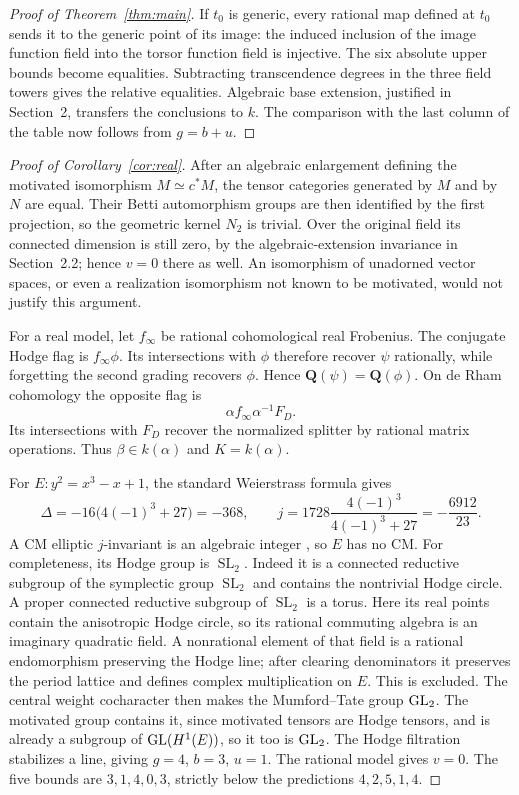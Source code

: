\documentclass[11pt]{article}
\theoremstyle{definition}\newtheorem{definition}[theorem]{Definition}
\theoremstyle{remark}\newtheorem{remark}[theorem]{Remark}
\newcommand{\Q}{\mathbf Q}\newcommand{\Z}{\mathbf Z}
\DeclareMathOperator{\SL}{SL}\DeclareMathOperator{\End}{End}
\begin{document}
\begin{proof}[Proof of Theorem~\ref{thm:main}]
If $t_0$ is generic, every rational map defined at $t_0$ sends it to the generic point of its image: the induced inclusion of the image function field into the torsor function field is injective. The six absolute upper bounds become equalities. Subtracting transcendence degrees in the three field towers gives the relative equalities. Algebraic base extension, justified in Section~2, transfers the conclusions to $k$. The comparison with the last column of the table now follows from $g=b+u$.
\end{proof}

\begin{proof}[Proof of Corollary~\ref{cor:real}]
After an algebraic enlargement defining the motivated isomorphism $M\simeq c^*M$, the tensor categories generated by $M$ and by $N$ are equal. Their Betti automorphism groups are then identified by the first projection, so the geometric kernel $N_2$ is trivial. Over the original field its connected dimension is still zero, by the algebraic-extension invariance in Section~2.2; hence $v=0$ there as well. An isomorphism of unadorned vector spaces, or even a realization isomorphism not known to be motivated, would not justify this argument.

For a real model, let $f_\infty$ be rational cohomological real Frobenius. The conjugate Hodge flag is $f_\infty\phi$. Its intersections with $\phi$ therefore recover $\psi$ rationally, while forgetting the second grading recovers $\phi$. Hence $\Q(\psi)=\Q(\phi)$. On de Rham cohomology the opposite flag is
\[
                    \alpha f_\infty\alpha^{-1}F_D.
\]
Its intersections with $F_D$ recover the normalized splitter by rational matrix operations. Thus $\beta\in k(\alpha)$ and $K=k(\alpha)$.

For $E:y^2=x^3-x+1$, the standard Weierstrass formula gives
\[
            \Delta=-16\bigl(4(-1)^3+27\bigr)=-368,
 \qquad j=1728\frac{4(-1)^3}{4(-1)^3+27}=-\frac{6912}{23}.
\]
A CM elliptic $j$-invariant is an algebraic integer \cite[Theorem 12.14 and Corollaries 12.15--12.16, p.~125]{MilneMF}, so $E$ has no CM. For completeness, its Hodge group is $\SL_2$. Indeed it is a connected reductive subgroup of the symplectic group $\SL_2$ and contains the nontrivial Hodge circle. A proper connected reductive subgroup of $\SL_2$ is a torus. Here its real points contain the anisotropic Hodge circle, so its rational commuting algebra is an imaginary quadratic field. A nonrational element of that field is a rational endomorphism preserving the Hodge line; after clearing denominators it preserves the period lattice and defines complex multiplication on $E$. This is excluded. The central weight cocharacter then makes the Mumford--Tate group $\operatorname{GL}_2$. The motivated group contains it, since motivated tensors are Hodge tensors, and is already a subgroup of $\operatorname{GL}(H^1(E))$, so it too is $\operatorname{GL}_2$. The Hodge filtration stabilizes a line, giving $g=4$, $b=3$, $u=1$. The rational model gives $v=0$. The five bounds are $3,1,4,0,3$, strictly below the predictions $4,2,5,1,4$.
\end{proof}
\end{document}
